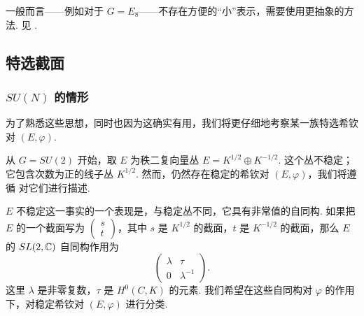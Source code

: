 一般而言——例如对于 $G=E_8$——不存在方便的“小”表示，需要使用更抽象的方法. 见 \cite{donga}.

\subsection{特选截面}
\label{distinguished}
\subsubsection{$SU(N)$ 的情形}

为了熟悉这些思想，同时也因为这确实有用，我们将更仔细地考察某一族特选希钦对 $(E,\varphi)$.

从 $G=SU(2)$ 开始，取 $E$ 为秩二复向量丛 $E=K^{1/2}\oplus K^{-1/2}$. 这个丛不稳定；它包含次数为正的线子丛 $K^{1/2}$. 然而，仍然存在稳定的希钦对 $(E,\varphi)$，我们将遵循 \cite{Hitchin} 对它们进行描述.

$E$ 不稳定这一事实的一个表现是，与稳定丛不同，它具有非常值的自同构. 如果把 $E$ 的一个截面写为 $\begin{pmatrix}s\\ t\end{pmatrix}$，其中 $s$ 是 $K^{1/2}$ 的截面，$t$ 是 $K^{-1/2}$ 的截面，那么 $E$ 的 $SL(2,{\mathbb C})$ 自同构作用为
\begin{equation}
\label{uti}
\begin{pmatrix}\lambda & \tau\\
0&\lambda^{-1}\end{pmatrix}.
\end{equation}
这里 $\lambda$ 是非零复数，$\tau$ 是 $H^0(C,K)$ 的元素. 我们希望在这些自同构对 $\varphi$ 的作用下，对稳定希钦对 $(E,\varphi)$ 进行分类.

